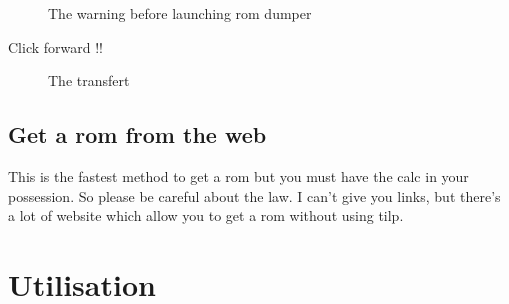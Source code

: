 \documentclass[10pt]{report}
\begin{document}
\begin{figure}[H]
\centering
{}
\caption{The warning before launching rom dumper}
\end{figure}
Click forward !!\newline

\begin{figure}[H]
\centering
{}
\caption{The transfert}
\end{figure}


\section{Get a rom from the web}

This is the fastest method to get a rom but you must have the calc in your possession.\newline
So please be careful about the law.\newline
I can't give you links, but there's a lot of website which allow you to get a rom without using tilp.\newline



\chapter{Utilisation}
\end{document}
